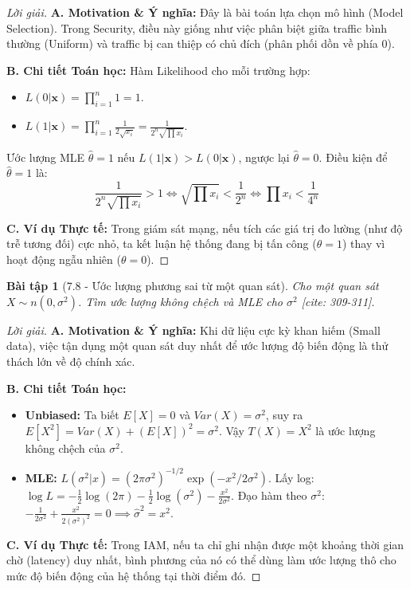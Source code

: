 \documentclass[8pt,a4paper]{article}
\newtheorem{exercise}{Bài tập}
\newenvironment{solution}{\begin{proof}[Lời giải]}{\end{proof}}
\begin{document}
\begin{solution}
\textbf{A. Motivation \& Ý nghĩa:} Đây là bài toán lựa chọn mô hình (Model Selection). Trong Security, điều này giống như việc phân biệt giữa traffic bình thường (Uniform) và traffic bị can thiệp có chủ đích (phân phối dồn về phía 0).

\textbf{B. Chi tiết Toán học:}
Hàm Likelihood cho mỗi trường hợp:
\begin{itemize}
    \item $L(0|\mathbf{x}) = \prod_{i=1}^n 1 = 1$.
    \item $L(1|\mathbf{x}) = \prod_{i=1}^n \frac{1}{2\sqrt{x_i}} = \frac{1}{2^n \sqrt{\prod x_i}}$.
\end{itemize}
Ước lượng MLE $\hat{\theta} = 1$ nếu $L(1|\mathbf{x}) > L(0|\mathbf{x})$, ngược lại $\hat{\theta} = 0$.
Điều kiện để $\hat{\theta} = 1$ là:
\[ \frac{1}{2^n \sqrt{\prod x_i}} > 1 \iff \sqrt{\prod x_i} < \frac{1}{2^n} \iff \prod x_i < \frac{1}{4^n} \]

\textbf{C. Ví dụ Thực tế:} Trong giám sát mạng, nếu tích các giá trị đo lường (như độ trễ tương đối) cực nhỏ, ta kết luận hệ thống đang bị tấn công ($\theta=1$) thay vì hoạt động ngẫu nhiên ($\theta=0$).
\end{solution}

\begin{exercise}[7.8 - Ước lượng phương sai từ một quan sát]
Cho một quan sát $X \sim n(0, \sigma^2)$. Tìm ước lượng không chệch và MLE cho $\sigma^2$ [cite: 309-311].
\end{exercise}

\begin{solution}
\textbf{A. Motivation \& Ý nghĩa:} Khi dữ liệu cực kỳ khan hiếm (Small data), việc tận dụng một quan sát duy nhất để ước lượng độ biến động là thử thách lớn về độ chính xác.

\textbf{B. Chi tiết Toán học:}
\begin{itemize}
    \item \textbf{Unbiased:} Ta biết $E[X] = 0$ và $Var(X) = \sigma^2$, suy ra $E[X^2] = Var(X) + (E[X])^2 = \sigma^2$. Vậy $T(X) = X^2$ là ước lượng không chệch của $\sigma^2$.
    \item \textbf{MLE:} $L(\sigma^2|x) = (2\pi\sigma^2)^{-1/2} \exp(-x^2/2\sigma^2)$.
    Lấy log: $\log L = -\frac{1}{2}\log(2\pi) - \frac{1}{2}\log(\sigma^2) - \frac{x^2}{2\sigma^2}$.
    Đạo hàm theo $\sigma^2$: $-\frac{1}{2\sigma^2} + \frac{x^2}{2(\sigma^2)^2} = 0 \implies \hat{\sigma}^2 = x^2$.
\end{itemize}
\textbf{C. Ví dụ Thực tế:} Trong IAM, nếu ta chỉ ghi nhận được một khoảng thời gian chờ (latency) duy nhất, bình phương của nó có thể dùng làm ước lượng thô cho mức độ biến động của hệ thống tại thời điểm đó.
\end{solution}
\end{document}

